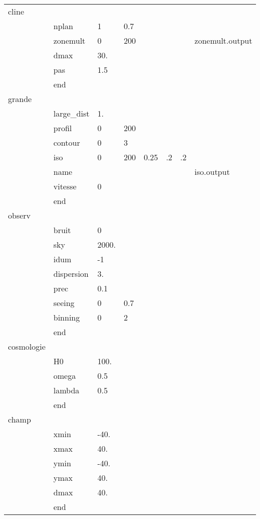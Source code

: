 {\bf
\begin{tabular}{llllllll}
cline& & & & & & & \\
        &nplan       &   1 & 0.7 & & & & \\
        &zonemult    &   0 & 200 & & && zonemult.output  \\
        &dmax        &   30.& & & & & \\
        &pas         &   1.5 & & & & & \\
        &end& & & & & & \\
grande& & & & & & & \\
        &large\_dist    & 1. & & & & & \\
        &profil        & 0 & 200 & & & & \\
        &contour       & 0 & 3  & & & & \\
        &iso           & 0 & 200 & 0.25 & .2 & .2 & \\
        &name          & & & & & &iso.output   \\
        &vitesse       &  0   & & & & & \\
        &end & & & & & & \\
observ& & & & & & & \\
        &bruit        &  0 & & & & & \\
        &sky          &  2000.  & & & & & \\
        &idum         &  -1  & & & & & \\
        &dispersion   &  3.   & & & & & \\
        &prec         &  0.1   & & & & & \\
        &seeing       &  0 &0.7 & & & & \\
        &binning      &  0 &2 & & & & \\
        &end& & & & & & \\
cosmologie& & & & & & & \\
        &H0         &    100.  & & & & & \\
        &omega      &    0.5  & & & & & \\
        &lambda     &    0.5   & & & & & \\
        &end & & & & & & \\
champ& & & & & & & \\
        &xmin        &   -40. & & & & & \\
        &xmax        &   40.  & & & & & \\
        &ymin        &   -40.  & & & & & \\
        &ymax        &   40.   & & & & & \\
        &dmax        &   40.   & & & & & \\
        &end& & & & & & \\
\end{tabular}
}\\
